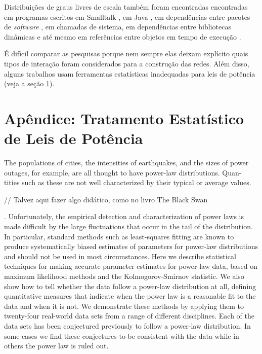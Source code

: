 \documentclass{article}
\begin{document}
Distribuições de graus livres de escala também foram encontradas encontradas em programas escritos em Smalltalk \cite{Marchesi2004,Concas2007}, em Java \cite{Hyland-Wood2006,Baxter2006,Ichii2008}, em dependências entre pacotes de \textit{software} \cite{Labelle2004}, em chamadas de sistema, em dependências entre bibliotecas dinâmicas \cite{Louridas2008} e até mesmo em referências entre objetos em tempo de execução \cite{Potanin2005}.

É difícil comparar as pesquisas porque nem sempre elas deixam explícito quais tipos de interação foram considerados para a construção das redes. Além disso, alguns trabalhos usam ferramentas estatísticas inadequadas para leis de potência (veja a seção \ref{sec:estatistica}).


\section{Apêndice: Tratamento Estatístico de Leis de Potência} \label{sec:estatistica}

              The populations of cities, the intensities of earthquakes, and the sizes of
power outages, for example, are all thought to have power-law distributions. Quan-
tities such as these are not well characterized by their typical or average values.


// Talvez aqui fazer algo didático, como no livro The Black Swan

. Unfortunately, the empirical detection and characterization of power laws is made difficult by the large fluctuations that occur in the tail of the distribution. In particular, standard methods such as least-squares fitting are known to produce systematically biased estimates of parameters for power-law distributions and should not be used in most circumstances. Here we describe statistical techniques for making accurate parameter estimates for power-law data, based on maximum likelihood methods and the Kolmogorov-Smirnov statistic. We also show how to tell whether the data follow a power-law distribution at all, defining quantitative measures that indicate when the power law is a reasonable fit to the data and when it is not. We demonstrate these methods by applying them to twenty-four real-world data sets from a range of different disciplines. Each of the data sets has been conjectured previously to follow a power-law distribution. In some cases we find these conjectures to be consistent with the data while in others the power law is ruled out.
\end{document}
